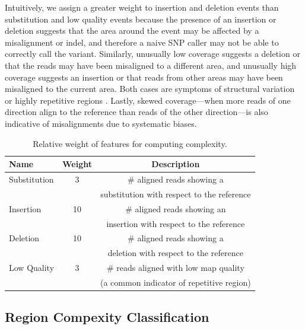\documentclass[10pt]{article}
\newcommand\TODO[1]{\textcolor{red}{TODO: #1}}
\begin{document}
Intuitively, we assign a greater weight to insertion and deletion events than substitution and low quality events because the presence of an insertion or deletion suggests that the area around the event may be affected by a misalignment or indel, and therefore a naive SNP caller may not be able to correctly call the variant.
Similarly, unusually low coverage suggests a deletion or that the reads may have been misaligned to a different area, and unusually high coverage suggests an insertion or that reads from other areas may have been misaligned to the current area.
Both cases are symptoms of structural variation or highly repetitive regions \cite{structuralVar}.
Lastly, skewed coverage---when more reads of one direction align to the reference than reads of the other direction---is also indicative of misalignments due to systematic biases.
\begin{table}[h!]
\tiny
  \centering
	\begin{tabular}{|l|c|c|}
    \hline Name & Weight & Description \\\hline
    Substitution & 3 & $\#$ aligned reads showing a \\ && substitution with respect to the reference\\\hline
    Insertion & 10 & $\#$ aligned reads showing an \\ && insertion with respect to the reference\\\hline
    Deletion & 10 & $\#$ aligned reads showing a \\ && deletion with respect to the reference\\\hline
    Low Quality & 3 & $\#$ reads aligned with low map quality \\ && (a common indicator of repetitive region)\\\hline
  \end{tabular}
  \caption{Relative weight of features for computing complexity.}
  \label{complexity}
\end{table}


\subsection{Region Compexity Classification}
\end{document}
